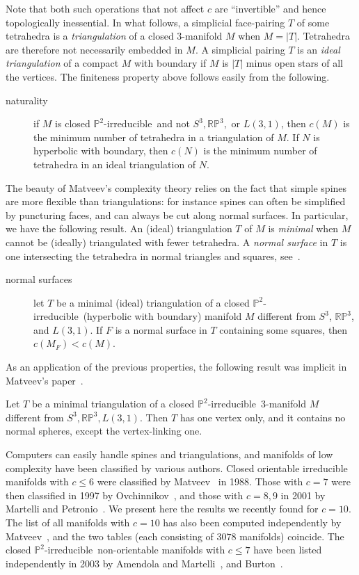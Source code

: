 \documentclass[10pt]{article}      %
\newcommand{\matP} {\ensuremath {\mathbb{P}}}
\newcommand{\matRP} {\ensuremath {\mathbb{RP}}}
\newcommand{\ptwoirred}{$\matP^2$-irreducible}
\begin{document}
Note that both such operations that not affect $c$ are ``invertible'' and hence
topologically inessential.
In what follows, a simplicial face-pairing $T$ of some tetrahedra is a 
\emph{triangulation} of a closed 3-manifold $M$ when $M = |T|$. Tetrahedra are therefore 
not necessarily embedded in $M$. A simplicial pairing $T$ is
an \emph{ideal triangulation} of a compact $M$ with boundary if $M$ is $|T|$ minus open stars of
all the vertices. The finiteness property above follows easily from the following.
\begin{description}
\item[naturality] if $M$ is closed \ptwoirred\ and not $S^3, \matRP^3,$ or $L(3,1)$,
then $c(M)$ is the minimum number of tetrahedra in a triangulation of $M$. If $N$ is
hyperbolic with boundary, 
then $c(N)$ is the minimum number of tetrahedra in an ideal triangulation of $N$.
\end{description} 

The beauty of Matveev's complexity theory relies on the fact that simple spines are more
flexible than triangulations: for instance spines can often be simplified by puncturing
faces, and can always be cut along normal surfaces. In particular, we have the following
result. An (ideal) triangulation $T$ of $M$ is \emph{minimal} when $M$ cannot be (ideally) 
triangulated with fewer tetrahedra. A \emph{normal surface} in $T$ is one intersecting
the tetrahedra in normal triangles and squares, see~\cite{normal}.
\begin{description}
\item[normal surfaces] let $T$ be a minimal (ideal) triangulation of a closed \ptwoirred\
(hyperbolic with boundary) manifold $M$ different from $S^3$, $\matRP^3$, 
and $L(3,1)$. If $F$ is a normal
surface in $T$ containing some squares, then $c(M_F)< c(M)$.
\end{description}

As an application of the previous properties, the following result was implicit in
Matveev's paper~\cite{Mat90}.
\begin{corollary}
Let $T$ be a minimal triangulation of a closed \ptwoirred\
3-manifold $M$ different from $S^3,\matRP^3, L(3,1)$. 
Then $T$ has one vertex only, and it contains no normal spheres, 
except the vertex-linking one.
\end{corollary}
Computers can easily handle spines and triangulations, 
and manifolds of low complexity have been classified
by various authors. 
Closed orientable irreducible 
manifolds with $c\leqslant 6$ were classified by Matveev~\cite{Mat88} 
in 1988. Those with $c=7$ were then classified in 1997 by 
Ovchinnikov~\cite{Ov, Mat:book}, 
and those with $c=8,9$ in 2001 by Martelli and Petronio~\cite{MaPe}.
We present here the results we recently found for $c=10$. 
The list of all manifolds with $c=10$ has
also been computed independently by Matveev~\cite{Mat:priv}, and the two
tables (each consisting of $3078$ manifolds) coincide.
The closed \ptwoirred\ non-orientable manifolds with $c\leqslant 7$ have been
listed independently in 2003 by
Amendola and Martelli~\cite{AmMa2}, and Burton~\cite{Bu}.
\end{document}

